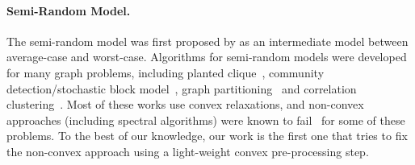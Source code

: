 %
%

\paragraph{Semi-Random Model.} The semi-random model was first proposed by \cite{blum1995coloring} as an intermediate model between average-case and worst-case. Algorithms for semi-random models were developed for many graph problems, including planted clique~\citep{Jerrum92, feige2000finding}, community detection/stochastic block model~\citep{feige2001heuristics,perry2017semidefinite,moitra2016robust}, graph partitioning~\citep{Kucera95,makarychev2012approximation} and correlation clustering~\citep{mathieu2010correlation,makarychev2015correlation}. Most of these works use convex relaxations, and non-convex approaches (including spectral algorithms) were known to fail~\citep{feige2001heuristics,moitra2016robust} for some of these problems. To the best of our knowledge, our work is the first one that tries to fix the non-convex approach using a light-weight convex pre-processing step.

